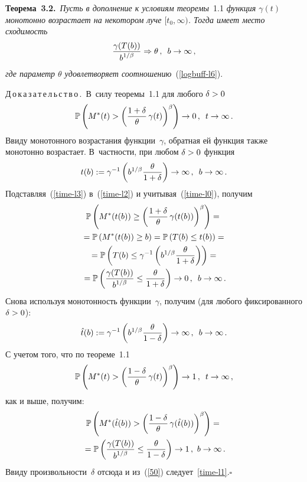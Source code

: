 \begin{multicols}{2}
\medskip

\noindent
\textbf{Теорема~3.2.}\ \textit{Пусть в дополнение  к условиям теоремы}~1.1 \textit{функция
$\gamma(t)$ монотонно возрастает на некотором луче $[t_0,\infty)$.
Тогда имеет место сходимость}
\begin{equation}
\displaystyle\frac{\displaystyle \gamma(T(b))\mathstrut}{\displaystyle b^{1/\beta}\mathstrut} \Rightarrow \theta\,,\enskip b \to
\infty\,, 
\label{time-l1}
\end{equation}
\textit{где параметр $\theta$ удовлетворяет соотношению}~(\ref{logbuff-l6}).

\smallskip

\noindent
Д\,о\,к\,а\,з\,а\,т\,е\,л\,ь\,с\,т\,в\,о\,.\ 
 В~силу теоремы~1.1 для любого $\delta \hm>0$
\begin{equation}
\mathbb{P}\left( M^*(t)
> \left( \displaystyle\frac{\displaystyle 1+\delta\mathstrut}{\displaystyle \theta\mathstrut}\,\gamma(t)\right)^\beta \right) \to 0\,,
\enskip t \to \infty\,.
\label{time-l2}
\end{equation}
Ввиду монотонного возрастания функции~$\gamma$, обратная ей функция
также монотонно возрастает. В~частности, при любом $\delta\hm>0$ функция
\begin{equation}
t(b):=\gamma^{-1}\left( b^{1/\beta} \displaystyle\frac{\displaystyle \theta\mathstrut}{\displaystyle 1+\delta\mathstrut} \right) \to \infty\,,\enskip
b \to \infty\,.
\label{time-l3}
\end{equation}
Подставляя~(\ref{time-l3}) в~(\ref{time-l2}) и учитывая~(\ref{time-l0}), получим
\begin{multline}
\mathbb{P}\left( M^*(t(b)) \ge \left(
\displaystyle\frac{\displaystyle 1+\delta\mathstrut}{\displaystyle \theta\mathstrut}\,\gamma(t(b))\right)^\beta \right)
={}\\
{}=\mathbb{P}\left(
M^*(t(b)) \ge  b\right)=\mathbb{P}\left( T(b) \le  t(b)\right)={}\\
{}=\mathbb{P}\left( T(b)\leq \gamma^{-1}\left( b^{1/\beta}
\displaystyle\frac{\displaystyle \theta\mathstrut}{\displaystyle 1+\delta\mathstrut}
\right)\right)={}\\
{}=\mathbb{P}\left( \displaystyle\frac{\displaystyle \gamma(T(b))\mathstrut}{\displaystyle b^{1/\beta }\mathstrut}
 \leq \displaystyle\frac{\displaystyle \theta\mathstrut}{\displaystyle 1+\delta\mathstrut} \right) \to 0\,,\enskip b \to  \infty\,.
 \label{50}
\end{multline}
Снова используя монотонность функции~$\gamma$, получим (для любого
фиксированного $\delta\hm>0$):
$$
\hat t(b):=\gamma^{-1}\left( b^{1/\beta} \displaystyle\frac{\displaystyle \theta\mathstrut}{\displaystyle 1-\delta\mathstrut}
\right) \to \infty\,,\enskip b \to \infty\,.
$$
С учетом того, что по теореме~1.1
$$
\mathbb{P}\left( M^*(t) > \left(
\displaystyle\frac{\displaystyle 1-\delta\mathstrut}{\displaystyle \theta\mathstrut}\,\gamma(t)\right)^\beta \right) \to 1\,,\enskip 
t \to \infty\,,
$$
как и выше, получим:
\begin{multline*}
\mathbb{P}\left( M^*(\hat t(b)) > \left(
\displaystyle\frac{\displaystyle 1-\delta\mathstrut}{\displaystyle \theta\mathstrut}\,\gamma(\hat t(b))\right)^\beta
\right)={}\\
{}=\mathbb{P}\left( \displaystyle\frac{\displaystyle \gamma(T(b))\mathstrut}{\displaystyle b^{1/\beta }\mathstrut} \leq
\displaystyle\frac{\displaystyle \theta\mathstrut}{\displaystyle 1-\delta\mathstrut} \right) \to 1\,,\ b \to \infty\,.
\end{multline*}
Ввиду произвольности~$\delta$ отсюда и из~(\ref{50}) следует~\eqref{time-l1}.\hfill$\square$


\end{multicols}

